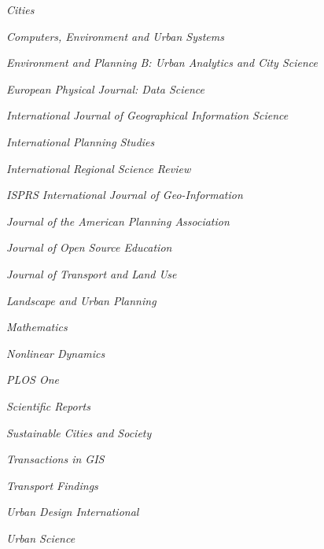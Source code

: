 \documentclass[12pt,letterpaper]{report}
\newcommand{\listitemspace}{0.15em}
\renewenvironment{itemize}
{\begin{list}{}{\setlength{\leftmargin}{0em}
			\setlength{\parskip}{0em}
			\setlength{\itemsep}{\listitemspace}
			\setlength{\parsep}{\listitemspace}}}
	{\end{list}}
\begin{document}
	\begin{itemize}

		\item \textit{Cities}

		\item \textit{Computers, Environment and Urban Systems}

		\item \textit{Environment and Planning B: Urban Analytics and City Science}

		\item \textit{European Physical Journal: Data Science}

		\item \textit{International Journal of Geographical Information Science}

		\item \textit{International Planning Studies}

		\item \textit{International Regional Science Review}

		\item \textit{ISPRS International Journal of Geo-Information}

		\item \textit{Journal of the American Planning Association}

		\item \textit{Journal of Open Source Education}

		\item \textit{Journal of Transport and Land Use}

		\item \textit{Landscape and Urban Planning}

		\item \textit{Mathematics}

		\item \textit{Nonlinear Dynamics}

		\item \textit{PLOS One}
		
		\item \textit{Scientific Reports}

		\item \textit{Sustainable Cities and Society}

		\item \textit{Transactions in GIS}

		\item \textit{Transport Findings}

		\item \textit{Urban Design International}

		\item \textit{Urban Science}

	\end{itemize}
\end{document}
